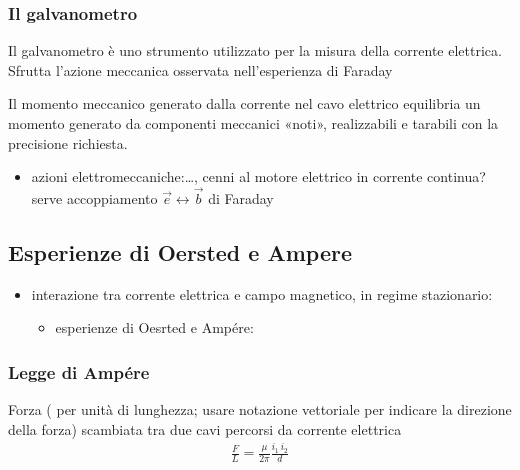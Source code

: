 \documentclass[letterpaper,10pt,italian]{jupyterBook}
\begin{document}
\subsubsection{Il galvanometro}
\label{\detokenize{ch/electromagnetism/electromagnetism-steady:il-galvanometro}}
\sphinxAtStartPar
Il galvanometro è uno strumento utilizzato per la misura della corrente elettrica. Sfrutta l’azione meccanica osservata nell’esperienza di Faraday

\sphinxAtStartPar
Il momento meccanico generato dalla corrente nel cavo elettrico equilibria un momento generato da componenti meccanici «noti», realizzabili e tarabili con la precisione richiesta.

\sphinxAtStartPar
{} 
\begin{itemize}
\item {} 
\sphinxAtStartPar
azioni elettro\sphinxhyphen{}meccaniche:…, cenni al motore elettrico in corrente continua? serve accoppiamento \(\vec{e} \leftrightarrow \vec{b}\) di Faraday

\end{itemize}


\subsection{Esperienze di Oersted e Ampere}
\label{\detokenize{ch/electromagnetism/electromagnetism-steady:esperienze-di-oersted-e-ampere}}\begin{itemize}
\item {} 
\sphinxAtStartPar
interazione tra corrente elettrica e campo magnetico, in regime stazionario:
\begin{itemize}
\item {} 
\sphinxAtStartPar
esperienze di Oesrted e Ampére:

\end{itemize}

\end{itemize}


\subsubsection{Legge di Ampére}
\label{\detokenize{ch/electromagnetism/electromagnetism-steady:legge-di-ampere}}
\sphinxAtStartPar
Forza ( per unità di lunghezza; usare notazione vettoriale per indicare la direzione della forza) scambiata tra due cavi percorsi da corrente elettrica
\begin{equation*}
\begin{split}\frac{F}{L} = \frac{\mu}{2 \pi} \frac{i_1 \, i_2}{d}\end{split}
\end{equation*}
\end{document}
